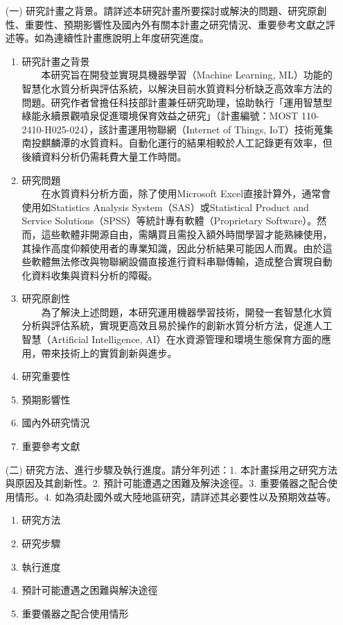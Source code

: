 \documentclass[12pt,a4paper]{article}
\begin{document}

\begin{enumerate}
\item[(一)] 研究計畫之背景。請詳述本研究計畫所要探討或解決的問題、研究原創性、重要性、預期影響性及國內外有關本計畫之研究情況、重要參考文獻之評述等。如為連續性計畫應說明上年度研究進度。
\begin{enumerate}[label=\arabic*.]
\item 研究計畫之背景\\
　　本研究旨在開發並實現具機器學習（Machine Learning, ML）功能的智慧化水質分析與評估系統，以解決目前水質資料分析缺乏高效率方法的問題。研究作者曾擔任科技部計畫兼任研究助理，協助執行「運用智慧型綠能永續景觀噴泉促進環境保育效益之研究」（計畫編號：MOST 110-2410-H025-024），該計畫運用物聯網（Internet of Things, IoT）技術蒐集南投麒麟潭的水質資料。自動化運行的結果相較於人工記錄更有效率，但後續資料分析仍需耗費大量工作時間。
\item 研究問題\\
　　在水質資料分析方面，除了使用Microsoft Excel直接計算外，通常會使用如Statistics Analysis System（SAS）或Statistical Product and Service Solutions（SPSS）等統計專有軟體（Proprietary Software）。然而，這些軟體非開源自由，需購買且需投入額外時間學習才能熟練使用，其操作高度仰賴使用者的專業知識，因此分析結果可能因人而異。由於這些軟體無法修改與物聯網設備直接進行資料串聯傳輸，造成整合實現自動化資料收集與資料分析的障礙。
\item 研究原創性\\
　　為了解決上述問題，本研究運用機器學習技術，開發一套智慧化水質分析與評估系統，實現更高效且易於操作的創新水質分析方法，促進人工智慧（Artificial Intelligence, AI）在水資源管理和環境生態保育方面的應用，帶來技術上的實質創新與進步。
\item 研究重要性\\
\item 預期影響性\\
\item 國內外研究情況\\
\item 重要參考文獻\\
\end{enumerate}

\item[(二)] 研究方法、進行步驟及執行進度。請分年列述：1. 本計畫採用之研究方法與原因及其創新性。2. 預計可能遭遇之困難及解決途徑。3. 重要儀器之配合使用情形。4. 如為須赴國外或大陸地區研究，請詳述其必要性以及預期效益等。
\begin{enumerate}[label=\arabic*.]
\item 研究方法\\
\item 研究步驟\\
\item 執行進度\\
\item 預計可能遭遇之困難與解決途徑\\
\item 重要儀器之配合使用情形\\
\end{enumerate}


\end{enumerate}
\end{document}
